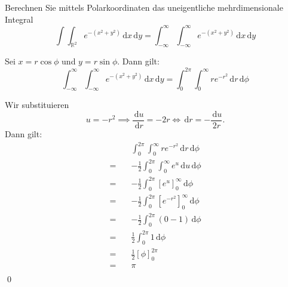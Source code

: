 \documentclass[answers]{exam}
\renewcommand{\d}{\,\mathrm{d}}
\newcommand{\R}{\mathbb{R}}
\begin{document}
\begin{questions}
    \newpage
    \question
    Berechnen Sie mittels Polarkoordinaten das uneigentliche mehrdimensionale Integral
    $$
        \int\int_{\R^2} e^{-(x^2+y^2)} \d x \d y = \int_{-\infty}^\infty \int_{-\infty}^\infty e^{-(x^2 + y^2)} \d x \d y
    $$
    \begin{solution}
        Sei $x = r\cos\phi$ und $y = r\sin\phi$. Dann gilt:
        $$
            \int_{-\infty}^\infty \int_{-\infty}^\infty e^{-(x^2 + y^2)} \d x \d y = \int_{0}^{2\pi} \int_{0}^\infty re^{-r^2} \d r \d \phi
        $$

        Wir substituieren
        $$
            u = -r^2 \implies \frac{\d u}{\d r} = -2r \iff \d r = -\frac{\d u}{2r}.
        $$
        Dann gilt:
        $$
            \begin{aligned}
                        & \int_{0}^{2\pi} \int_{0}^\infty re^{-r^2} \d r \d \phi               \\
                = \quad & -\frac{1}{2}\int_{0}^{2\pi} \int_{0}^\infty e^{u} \d u \d \phi       \\
                = \quad & -\frac{1}{2}\int_{0}^{2\pi} \left[e^u\right]_{0}^\infty \d \phi      \\
                = \quad & -\frac{1}{2}\int_{0}^{2\pi} \left[e^{-r^2}\right]_{0}^\infty \d \phi \\
                = \quad & -\frac{1}{2}\int_{0}^{2\pi} \left(0 - 1\right) \d \phi               \\
                = \quad & \frac{1}{2}\int_{0}^{2\pi} 1 \d \phi                                 \\
                = \quad & \frac{1}{2}\left[\phi\right]_{0}^{2\pi}                              \\
                = \quad & \pi                                                                  \\
            \end{aligned}
        $$\qed
    \end{solution}


\end{questions}
\end{document}
